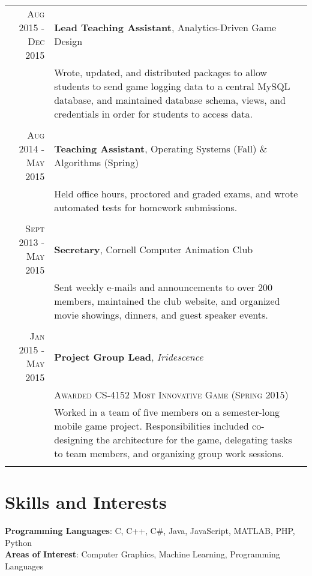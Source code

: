 \documentclass[a4paper,10pt]{article} %
\begin{document}
\begin{tabular}{rp{11.8cm}}

\textsc{Aug 2015 - Dec 2015} & \textbf{Lead Teaching Assistant}, Analytics-Driven Game Design \\
& \small{Wrote, updated, and distributed packages to allow students to send game logging data to a central MySQL database, and maintained database schema, views, and credentials in order for students to access data.}\\
\multicolumn{2}{c}{} \\


\textsc{Aug 2014 - May 2015} & \textbf{Teaching Assistant}, Operating Systems (Fall) \& Algorithms (Spring) \\
& \small{Held office hours, proctored and graded exams, and wrote automated tests for homework submissions.}\\
\multicolumn{2}{c}{} \\


\textsc{Sept 2013 - May 2015} & \textbf{Secretary}, Cornell Computer Animation Club\\
& \small{Sent weekly e-mails and announcements to over 200 members, maintained the club website, and organized movie showings, dinners, and guest speaker events.}\\
\multicolumn{2}{c}{} \\


\textsc{Jan 2015 - May 2015} & \textbf{Project Group Lead}, \textit{Iridescence}\\
& \textsc{Awarded CS-4152 Most Innovative Game (Spring 2015)}\\
& \small{Worked in a team of five members on a semester-long mobile game project. Responsibilities included co-designing the architecture for the game, delegating tasks to team members, and organizing group work sessions.}\\
\multicolumn{2}{c}{} \\

\end{tabular}


\section{Skills and Interests}

\textbf{Programming Languages}: C, C++, C\#, Java, JavaScript, MATLAB, PHP, Python\\
\textbf{Areas of Interest}: Computer Graphics, Machine Learning, Programming Languages

\end{document}
